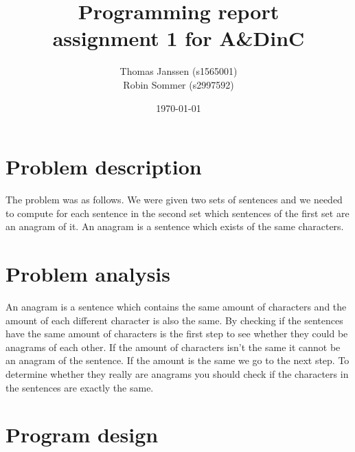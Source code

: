 \documentclass[a4paper]{article}
\begin{document}
\title{Programming report \\
       assignment 1 for A\&DinC
}
\date{\today}
\author{Thomas Janssen (s1565001) \\
        	Robin Sommer (s2997592)
}

\maketitle

\section{Problem description}

The problem was as follows. We were given two sets of sentences and we needed to compute for each sentence in the second set which sentences of the first set are an anagram of it. An anagram is a sentence which exists of the same characters.

\section{Problem analysis}

An anagram is a sentence which contains the same amount of characters and the amount of each different  character is also the same. By checking if the sentences have the same amount of characters is the first step to see whether they could be anagrams of each other. If the amount of characters isn't the same it cannot be an anagram of the sentence. If the amount is the same we go to the next step. To determine whether they really are anagrams you should check if the characters in the sentences are exactly the same.

\section{Program design}
\end{document}
